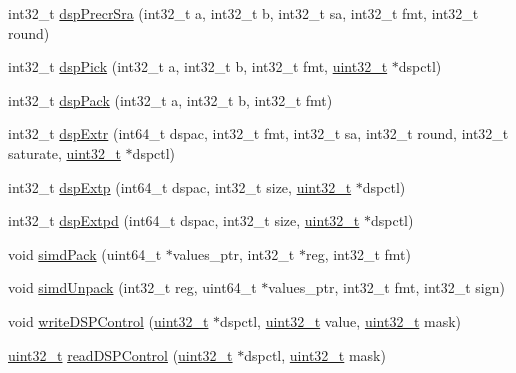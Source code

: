 \begin{DoxyCompactItemize}
int32\_\-t \hyperlink{namespaceMipsISA_a5211ce9eb66240a16ac897bca368a8f4}{dspPrecrSra} (int32\_\-t a, int32\_\-t b, int32\_\-t sa, int32\_\-t fmt, int32\_\-t round)
\item 
int32\_\-t \hyperlink{namespaceMipsISA_a774010022864d198d9ae706107ad49ea}{dspPick} (int32\_\-t a, int32\_\-t b, int32\_\-t fmt, \hyperlink{Type_8hh_a435d1572bf3f880d55459d9805097f62}{uint32\_\-t} $\ast$dspctl)
\item 
int32\_\-t \hyperlink{namespaceMipsISA_a1af18d7c519e520651d9df60ec91b3ec}{dspPack} (int32\_\-t a, int32\_\-t b, int32\_\-t fmt)
\item 
int32\_\-t \hyperlink{namespaceMipsISA_add5a0b9b060578a4f173a8e875cd283f}{dspExtr} (int64\_\-t dspac, int32\_\-t fmt, int32\_\-t sa, int32\_\-t round, int32\_\-t saturate, \hyperlink{Type_8hh_a435d1572bf3f880d55459d9805097f62}{uint32\_\-t} $\ast$dspctl)
\item 
int32\_\-t \hyperlink{namespaceMipsISA_ad04813c746ce8f173114b51ca2ee74fb}{dspExtp} (int64\_\-t dspac, int32\_\-t size, \hyperlink{Type_8hh_a435d1572bf3f880d55459d9805097f62}{uint32\_\-t} $\ast$dspctl)
\item 
int32\_\-t \hyperlink{namespaceMipsISA_a0b12eac93513ce034deb16dc654db7be}{dspExtpd} (int64\_\-t dspac, int32\_\-t size, \hyperlink{Type_8hh_a435d1572bf3f880d55459d9805097f62}{uint32\_\-t} $\ast$dspctl)
\item 
void \hyperlink{namespaceMipsISA_a74fad38caeb362b68c915e1255139c92}{simdPack} (uint64\_\-t $\ast$values\_\-ptr, int32\_\-t $\ast$reg, int32\_\-t fmt)
\item 
void \hyperlink{namespaceMipsISA_ada59d08ed172da7300eb904edfd82886}{simdUnpack} (int32\_\-t reg, uint64\_\-t $\ast$values\_\-ptr, int32\_\-t fmt, int32\_\-t sign)
\item 
void \hyperlink{namespaceMipsISA_ad74065c805a5647e31fec67534caf1e9}{writeDSPControl} (\hyperlink{Type_8hh_a435d1572bf3f880d55459d9805097f62}{uint32\_\-t} $\ast$dspctl, \hyperlink{Type_8hh_a435d1572bf3f880d55459d9805097f62}{uint32\_\-t} value, \hyperlink{Type_8hh_a435d1572bf3f880d55459d9805097f62}{uint32\_\-t} mask)
\item 
\hyperlink{Type_8hh_a435d1572bf3f880d55459d9805097f62}{uint32\_\-t} \hyperlink{namespaceMipsISA_a7c5243738a02678e025034797a57ff7d}{readDSPControl} (\hyperlink{Type_8hh_a435d1572bf3f880d55459d9805097f62}{uint32\_\-t} $\ast$dspctl, \hyperlink{Type_8hh_a435d1572bf3f880d55459d9805097f62}{uint32\_\-t} mask)
\end{DoxyCompactItemize}
